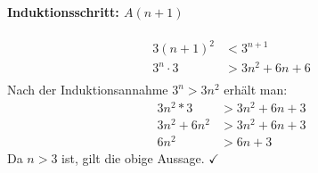 \documentclass[11pt,a4paper]{article}
\begin{document}
\paragraph{Induktionsschritt: $A(n+1)$}
\begin{align*}
3(n+1)^2 &< 3^{n+1}\\
3^n \cdot 3 &> 3n^2+6n+6\\
\end{align*}
Nach der Induktionsannahme $3^n > 3n^2$ erhält man:
\begin{align*}
3n^2 * 3 &> 3n^2 + 6n + 3\\
3n^2 + 6n^2 &> 3n^2 + 6n +3\\
6n^2 &> 6n + 3
\end{align*}
Da $n > 3$ ist, gilt die obige Aussage. $\checkmark$
\end{document}
